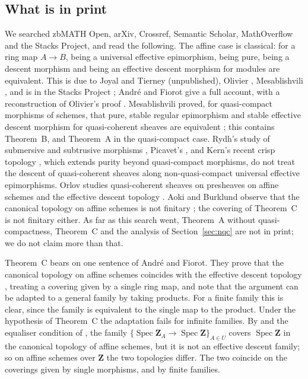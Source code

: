 \documentclass[11pt,a4paper]{amsart}
\theoremstyle{definition}
\theoremstyle{remark}
\newcommand{\Z}{\mathbf Z}
\newcommand{\Spec}{\operatorname{Spec}}
\begin{document}
\subsection*{What is in print}
We searched zbMATH Open, arXiv, Crossref, Semantic Scholar, MathOverflow and the Stacks Project, and read the following. The affine case is classical: for a ring map $A\to B$, being a universal effective epimorphism, being pure, being a descent morphism and being an effective descent morphism for modules are equivalent. This is due to Joyal and Tierney (unpublished), Olivier \cite{olivier}, Mesablishvili \cite{mesablishvili}, and is in the Stacks Project \cite[08WE, 08XA, 0EUA]{stacks}; André and Fiorot give a full account, with a reconstruction of Olivier's proof \cite[\S\S2--3]{af}. Mesablishvili proved, for quasi-compact morphisms of schemes, that pure, stable regular epimorphism and stable effective descent morphism for quasi-coherent sheaves are equivalent \cite{mesablishvili-acs,mesablishvili2004}; this contains Theorem~B, and Theorem~A in the quasi-compact case. Rydh's study of submersive and subtrusive morphisms \cite{rydh}, Picavet's \cite{picavet}, and Kern's recent crisp topology \cite{kern}, which extends purity beyond quasi-compact morphisms, do not treat the descent of quasi-coherent sheaves along non-quasi-compact universal effective epimorphisms. Orlov studies quasi-coherent sheaves on presheaves on affine schemes and the effective descent topology \cite{orlov}. Aoki and Burklund observe that the canonical topology on affine schemes is not finitary \cite[footnote~1]{ab}; the covering of Theorem~C is not finitary either. As far as this search went, Theorem~A without quasi-compactness, Theorem~C and the analysis of Section~\ref{sec:nqc} are not in print; we do not claim more than that.

Theorem~C bears on one sentence of André and Fiorot. They prove that the canonical topology on affine schemes coincides with the effective descent topology \cite[Thm.~3.2]{af}, treating a covering given by a single ring map, and note that the argument can be adapted to a general family by taking products. For a finite family this is clear, since the family is equivalent to the single map to the product. Under the hypothesis of Theorem~C the adaptation fails for infinite families. By \cite[0EUA]{stacks} and the equaliser condition of \cite[0EUF]{stacks}, the family $\{\Spec\Z_A\to\Spec\Z\}_{A\in U}$ covers $\Spec\Z$ in the canonical topology of affine schemes, but it is not an effective descent family; so on affine schemes over $\Z$ the two topologies differ. The two coincide on the coverings given by single morphisms, and by finite families.
\end{document}
